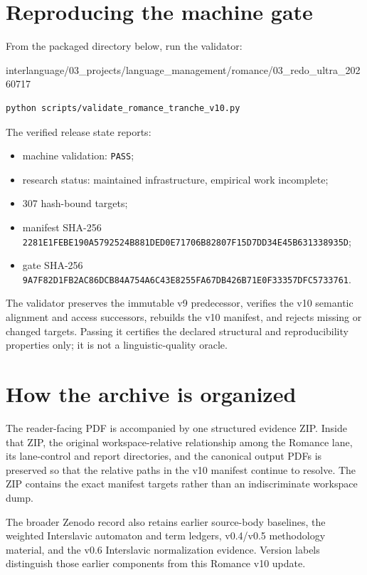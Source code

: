 \documentclass[10pt,a4paper]{article}
\begin{document}
\section*{Reproducing the machine gate}

From the packaged directory below, run the validator:

{\scriptsize\ttfamily interlanguage/03\_projects/language\_management/romance/03\_redo\_ultra\_20260717}

\begin{verbatim}
python scripts/validate_romance_tranche_v10.py
\end{verbatim}

The verified release state reports:

\begin{itemize}
  \item machine validation: \texttt{PASS};
  \item research status: maintained infrastructure, empirical work incomplete;
  \item 307 hash-bound targets;
  \item manifest SHA-256
  \texttt{2281E1FEBE190A5792524B881DED0E71706B82807F15D7DD34E45B631338935D};
  \item gate SHA-256
  \texttt{9A7F82D1FB2AC86DCB84A754A6C43E8255FA67DB426B71E0F33357DFC5733761}.
\end{itemize}

The validator preserves the immutable v9 predecessor, verifies the v10 semantic
alignment and access successors, rebuilds the v10 manifest, and rejects missing
or changed targets. Passing it certifies the declared structural and reproducibility
properties only; it is not a linguistic-quality oracle.

\section*{How the archive is organized}

The reader-facing PDF is accompanied by one structured evidence ZIP. Inside that
ZIP, the original workspace-relative relationship among the Romance lane, its
lane-control and report directories, and the canonical output PDFs is preserved
so that the relative paths in the v10 manifest continue to resolve. The ZIP
contains the exact manifest targets rather than an indiscriminate workspace dump.

The broader Zenodo record also retains earlier source-body baselines, the weighted
Interslavic automaton and term ledgers, v0.4/v0.5 methodology material, and the
v0.6 Interslavic normalization evidence. Version labels distinguish those earlier
components from this Romance v10 update.
\end{document}
